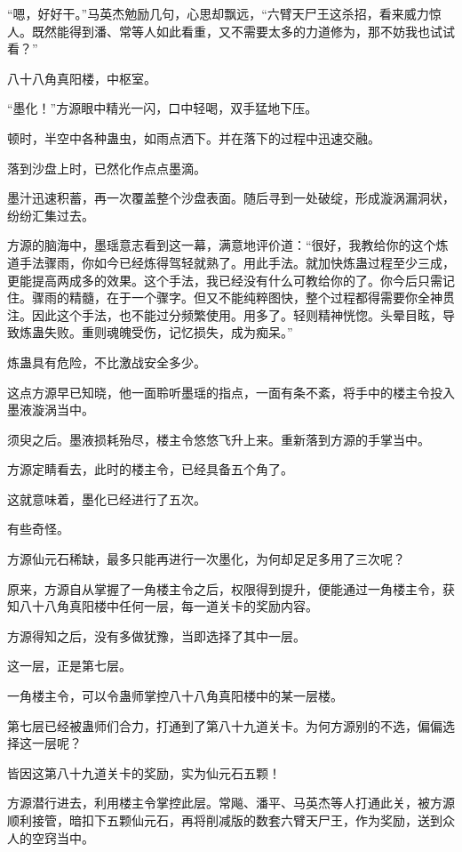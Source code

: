 \begin{this_body}
“嗯，好好干。”马英杰勉励几句，心思却飘远，“六臂天尸王这杀招，看来威力惊人。既然能得到潘、常等人如此看重，又不需要太多的力道修为，那不妨我也试试看？”

八十八角真阳楼，中枢室。

“墨化！”方源眼中精光一闪，口中轻喝，双手猛地下压。

顿时，半空中各种蛊虫，如雨点洒下。并在落下的过程中迅速交融。

落到沙盘上时，已然化作点点墨滴。

墨汁迅速积蓄，再一次覆盖整个沙盘表面。随后寻到一处破绽，形成漩涡漏洞状，纷纷汇集过去。

方源的脑海中，墨瑶意志看到这一幕，满意地评价道：“很好，我教给你的这个炼道手法骤雨，你如今已经炼得驾轻就熟了。用此手法。就加快炼蛊过程至少三成，更能提高两成多的效果。这个手法，我已经没有什么可教给你的了。你今后只需记住。骤雨的精髓，在于一个骤字。但又不能纯粹图快，整个过程都得需要你全神贯注。因此这个手法，也不能过分频繁使用。用多了。轻则精神恍惚。头晕目眩，导致炼蛊失败。重则魂魄受伤，记忆损失，成为痴呆。”

炼蛊具有危险，不比激战安全多少。

这点方源早已知晓，他一面聆听墨瑶的指点，一面有条不紊，将手中的楼主令投入墨液漩涡当中。

须臾之后。墨液损耗殆尽，楼主令悠悠飞升上来。重新落到方源的手掌当中。

方源定睛看去，此时的楼主令，已经具备五个角了。

这就意味着，墨化已经进行了五次。

有些奇怪。

方源仙元石稀缺，最多只能再进行一次墨化，为何却足足多用了三次呢？

原来，方源自从掌握了一角楼主令之后，权限得到提升，便能通过一角楼主令，获知八十八角真阳楼中任何一层，每一道关卡的奖励内容。

方源得知之后，没有多做犹豫，当即选择了其中一层。

这一层，正是第七层。

一角楼主令，可以令蛊师掌控八十八角真阳楼中的某一层楼。

第七层已经被蛊师们合力，打通到了第八十九道关卡。为何方源别的不选，偏偏选择这一层呢？

皆因这第八十九道关卡的奖励，实为仙元石五颗！

方源潜行进去，利用楼主令掌控此层。常飚、潘平、马英杰等人打通此关，被方源顺利接管，暗扣下五颗仙元石，再将削减版的数套六臂天尸王，作为奖励，送到众人的空窍当中。


\end{this_body}
